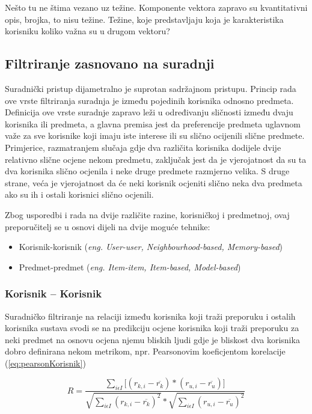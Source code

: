 \documentclass[times, utf8, diplomski, numeric]{fer}
\begin{document}
Nešto tu ne štima vezano uz težine. Komponente vektora zapravo su kvantitativni
opis, brojka, to nisu težine. Težine, koje predstavljaju koja je karakteristika
korisniku koliko važna su u drugom vektoru?

\subsection{Filtriranje zasnovano na suradnji}
Suradnički pristup dijametralno je suprotan sadržajnom pristupu. Princip rada
ove vrste filtriranja suradnja je između pojedinih korisnika odnosno predmeta.
Definicija ove vrste suradnje zapravo leži u određivanju sličnosti između dvaju
korisnika ili predmeta, a glavna premisa jest da preferencije predmeta uglavnom
važe za sve korisnike koji imaju iste interese ili su slično ocijenili slične
predmete. Primjerice, razmatranjem slučaja gdje dva različita korisnika dodijele
dvije relativno slične ocjene nekom predmetu, zaključak jest da je vjerojatnost
da su ta dva korisnika slično ocjenila i neke druge predmete razmjerno velika. S
druge strane, veća je vjerojatnost da će neki korisnik ocjeniti slično neka dva
predmeta ako su ih i ostali korisnici slično ocjenili.

Zbog usporedbi i rada na dvije različite razine, korisničkoj i predmetnoj, ovaj
preporučitelj se u osnovi dijeli na dvije moguće tehnike:
\begin{itemize}
  \item Korisnik-korisnik (\emph{eng. User-user, Neighbourhood-based,
  Memory-based})
  \item Predmet-predmet (\emph{eng. Item-item, Item-based, Model-based})
\end{itemize}

\subsubsection{Korisnik -- Korisnik}
Suradničko filtriranje na relaciji između korisnika koji traži preporuku i
ostalih korisnika sustava svodi se na predikciju ocjene korisnika koji traži
preporuku za neki predmet na osnovu ocjena njemu bliskih ljudi gdje je bliskost
dva korisnika dobro definirana nekom metrikom, npr. Pearsonovim koeficjentom
korelacije (\ref{eq:pearsonKorisnik})

\begin{equation}
\label{eq:pearsonKorisnik}
	R = \frac
			{\sum_{i \epsilon I} 
				\big[
					(r_{k,i} - \overline{r_k}) \ast
					(r_{u,i} - \overline{r_u})
				\big]
			}
			{
				\sqrt{{\sum_{i \epsilon I} (r_{k,i} - \overline{r_k})^2}} \ast 
				\sqrt{{\sum_{i \epsilon I} (r_{u,i} - \overline{r_u})^2}}
			}
\end{equation}
\end{document}
